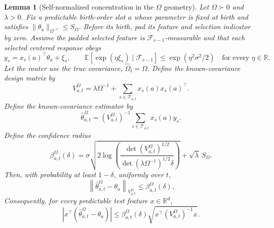 \documentclass{article} %
\newtheorem{lemma}[theorem]{Lemma}
\begin{document}
\begin{lemma}[Self-normalized concentration in the \(\Omega\) geometry]
\label{lem:hyper-sn}
Let \(\Omega\succ0\) and \(\lambda>0\). Fix a predictable birth-order slot
\(a\) whose parameter is fixed at birth and satisfies
\(\|\theta_a\|_{\Omega^{-1}}\le S_\Omega\). Before its birth, pad its feature
and selection indicator by zero. Assume the padded selected feature is
\(\mathcal F_{s-1}\)-measurable and that each selected centered response obeys
\[
y_s=x_s(a)^\top\theta_a+\xi_s,
\qquad
\mathbb E[\exp(\eta\xi_s)\mid\mathcal F_{s-1}]
\le \exp(\eta^2\sigma^2/2)
\quad\text{for every }\eta\in\mathbb R.
\]
Let the router use the true covariance, \(\widehat\Omega_t=\Omega\). Define the
known-covariance design matrix by
\begin{equation}
\label{eq:hyper-known-V}
V_{a,t}^{\Omega}
=
\lambda\Omega^{-1}
+
\sum_{s\in\mathcal{T}_{a,t}}
x_s(a)x_s(a)^\top .
\end{equation}
Define the known-covariance estimator by
\begin{equation}
\label{eq:hyper-known-est}
\widehat{\theta}_{a,t}^{\Omega}
=
\left(V_{a,t}^{\Omega}\right)^{-1}
\sum_{s\in\mathcal{T}_{a,t}}
x_s(a)y_s .
\end{equation}
Define the confidence radius
\begin{equation}
\label{eq:hyper-beta}
\beta_{a,t}^{\Omega}(\delta)
=
\sigma
\sqrt{
2\log
\left(
\frac{
\det(V_{a,t}^{\Omega})^{1/2}
}{
\det(\lambda\Omega^{-1})^{1/2}\delta
}
\right)
}
+
\sqrt{\lambda}\,S_{\Omega}.
\end{equation}
Then, with probability at least \(1-\delta\), uniformly over \(t\),
\begin{equation}
\label{eq:hyper-sn-param}
\left\|
\widehat{\theta}_{a,t}^{\Omega}-\theta_a
\right\|_{V_{a,t}^{\Omega}}
\le
\beta_{a,t}^{\Omega}(\delta).
\end{equation}
Consequently, for every predictable test feature \(x\in\mathbb{R}^d\),
\begin{equation}
\label{eq:hyper-sn-prediction}
\left|
x^\top
\left(
\widehat{\theta}_{a,t}^{\Omega}-\theta_a
\right)
\right|
\le
\beta_{a,t}^{\Omega}(\delta)
\sqrt{x^\top\left(V_{a,t}^{\Omega}\right)^{-1}x}.
\end{equation}
\end{lemma}
\end{document}
